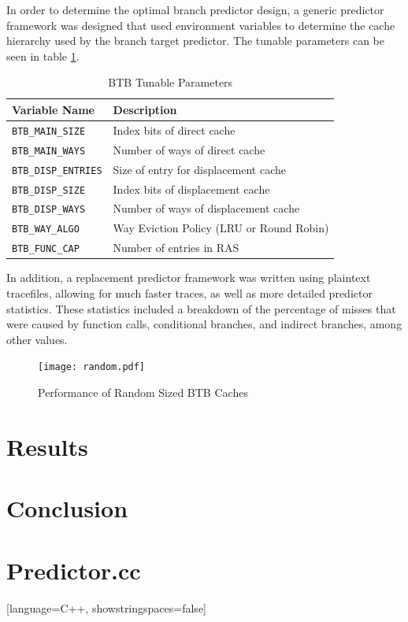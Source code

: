 \documentclass[twocolumn]{article}
\newcommand{\centerimage}[3]{
\begin{figure}[ht!]  
\begin{center} #1
\caption{#2}
\label{#3}
\end{center}
\end{figure}}
\begin{document}
In order to determine the optimal branch predictor design, a generic
predictor framework was designed that used environment variables to
determine the cache hierarchy used by the branch target predictor.
The tunable parameters can be seen in table \ref{envars}. 

\begin{table}
\begin{center}\begin{tabular}{p{}p{}}
Variable Name & Description \\
\hline
\texttt{BTB\_MAIN\_SIZE} & Index bits of direct cache \\
\texttt{BTB\_MAIN\_WAYS} & Number of ways of direct cache \\
\texttt{BTB\_DISP\_ENTRIES} & Size of entry for displacement cache \\
\texttt{BTB\_DISP\_SIZE} & Index bits of displacement cache \\
\texttt{BTB\_DISP\_WAYS} & Number of ways of displacement cache \\
\texttt{BTB\_WAY\_ALGO} & Way Eviction Policy (LRU or Round Robin) \\
\texttt{BTB\_FUNC\_CAP} & Number of entries in RAS
\end{tabular}\end{center}
\caption{BTB Tunable Parameters}
\label{envars}
\end{table}

In addition, a replacement predictor framework was written using
plaintext tracefiles, allowing for much faster traces, as well as more
detailed predictor statistics. These statistics included a breakdown of
the percentage of misses that were caused by function calls,
conditional branches, and indirect branches, among other values. 


\centerimage{\texttt{[image: random.pdf]}}{Performance
  of Random Sized BTB Caches}{bgraph}
\section{Results}
\section{Conclusion}
\newpage
\onecolumn
\section{Predictor.cc}
[language=C++, showstringspaces=false]
\end{document}
